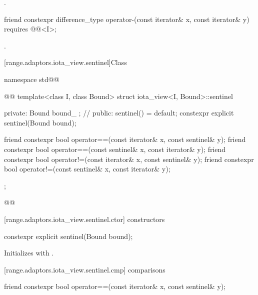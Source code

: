 \begin{itemdescr}
\pnum
\returns {}.
\end{itemdescr}

\begin{itemdecl}
friend constexpr difference_type operator-(const iterator& x, const iterator& y)
  requires @@<I>;
\end{itemdecl}

\begin{itemdescr}
\pnum
\returns {}.
\end{itemdescr}

[range.adaptors.iota_view.sentinel]{Class }

\begin{codeblock}
namespace std@@ { @@
  template<class I, class Bound>
  struct iota_view<I, Bound>::sentinel {
  private:
    Bound bound_ {}; // \expos
  public:
    sentinel() = default;
    constexpr explicit sentinel(Bound bound);

    friend constexpr bool operator==(const iterator& x, const sentinel& y);
    friend constexpr bool operator==(const sentinel& x, const iterator& y);
    friend constexpr bool operator!=(const iterator& x, const sentinel& y);
    friend constexpr bool operator!=(const sentinel& x, const iterator& y);
  };
}@\oldtxt{\}}@
\end{codeblock}

[range.adaptors.iota_view.sentinel.ctor]{ constructors}

\begin{itemdecl}
constexpr explicit sentinel(Bound bound);
\end{itemdecl}

\begin{itemdescr}
\pnum
\effects Initializes  with .
\end{itemdescr}

[range.adaptors.iota_view.sentinel.cmp]{ comparisons}

\begin{itemdecl}
friend constexpr bool operator==(const iterator& x, const sentinel& y);
\end{itemdecl}

